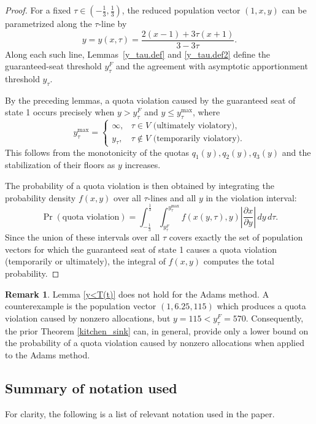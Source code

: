\documentclass[11pt]{article}
\theoremstyle{definition}
\newtheorem{remark}[theorem]{Remark}
\theoremstyle{definition}
\begin{document}
\begin{proof}
For a fixed $\tau \in (-\frac{1}{3},\frac{1}{3})$, the reduced population vector $(1,x,y)$ can be parametrized along the $\tau$-line by
$$
y = y(x,\tau) = \frac{2(x-1) + 3\tau(x+1)}{3-3\tau}.
$$
Along each such line, Lemmas~\ref{y_tau.def} and \ref{y_tau.def2} define the guaranteed-seat threshold $y_\tau^F$ and the agreement with asymptotic apportionment threshold $y_\tau$. 

By the preceding lemmas, a quota violation caused by the guaranteed seat of state 1 occurs precisely when $y > y_\tau^F$ and $y \le y_\tau^\mathrm{max}$, where
$$
y_\tau^\mathrm{max} = 
\begin{cases}
\infty, & \tau \in V \text{ (ultimately violatory)},\\
y_\tau, & \tau \notin V \text{ (temporarily violatory)}.
\end{cases}
$$
This follows from the monotonicity of the quotas $q_1(y),q_2(y),q_3(y)$ and the stabilization of their floors as $y$ increases. 

The probability of a quota violation is then obtained by integrating the probability density $f(x,y)$ over all $\tau$-lines and all $y$ in the violation interval:
$$
\Pr(\text{quota violation}) = \int_{-\frac{1}{3}}^{\frac{1}{3}} 
\int_{y^F_\tau}^{y_\tau^\mathrm{max}} f(x(y,\tau),y) \left|\frac{\partial x}{\partial y}\right| \, dy\, d\tau.
$$
Since the union of these intervals over all $\tau$ covers exactly the set of population vectors for which the guaranteed seat of state 1 causes a quota violation (temporarily or ultimately), the integral of $f(x,y)$ computes the total probability. 
\end{proof}

\begin{remark}
    Lemma \ref{y<T(t)} does not hold for the Adams method. A counterexample is the population vector $(1,6.25,115)$ which produces a quota violation caused by nonzero allocations, but $y = 115 < y_\tau^F = 570$. Consequently, the prior Theorem \ref{kitchen_sink} can, in general, provide only a lower bound on the probability of a quota violation caused by nonzero allocations when applied to the Adams method.\end{remark}

\subsection{Summary of notation used}
For clarity, the following is a list of relevant notation used in the paper.
\end{document}
